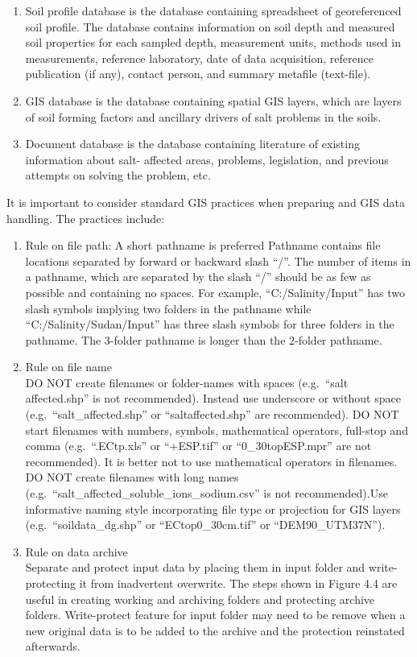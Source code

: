 \documentclass[
  10pt,
  b5paper,
]{book}
\providecommand{\tightlist}{%
  \setlength{\itemsep}{0pt}\setlength{\parskip}{0pt}}
\begin{document}
\begin{enumerate}
\def\labelenumi{\roman{enumi}.}
\tightlist
\item
  Soil profile database is the database containing spreadsheet of georeferenced soil profile. The database contains information on soil depth and measured soil properties for each sampled depth, measurement units, methods used in measurements, reference laboratory, date of data acquisition, reference publication (if any), contact person, and summary metafile (text-file).
\item
  GIS database is the database containing spatial GIS layers, which are layers of soil forming factors and ancillary drivers of salt problems in the soils.
\item
  Document database is the database containing literature of existing information about salt- affected areas, problems, legislation, and previous attempts on solving the problem, etc.
\end{enumerate}

It is important to consider standard GIS practices when preparing and GIS data handling. The practices include:

\begin{enumerate}
\def\labelenumi{\Roman{enumi}.}
\item
  Rule on file path: A short pathname is preferred
  Pathname contains file locations separated by forward or backward slash ``/''. The number of items in a pathname, which are separated by the slash ``/'' should be as few as possible and containing no spaces. For example, ``C:/Salinity/Input'' has two slash symbols implying two folders in the pathname while ``C:/Salinity/Sudan/Input'' has three slash symbols for three folders in the pathname. The 3-folder pathname is longer than the 2-folder pathname.
\item
  Rule on file name\\
  DO NOT create filenames or folder-names with spaces (e.g.~``salt affected.shp'' is not recommended). Instead use underscore or without space (e.g.~``salt\_affected.shp'' or ``saltaffected.shp'' are recommended). DO NOT start filenames with numbers, symbols, mathematical operators, full-stop and comma (e.g.~``.ECtp.xls'' or ``+ESP.tif'' or ``0\_30topESP.mpr'' are not recommended). It is better not to use mathematical operators in filenames.
  DO NOT create filenames with long names (e.g.~``salt\_affected\_soluble\_ions\_sodium.csv'' is not recommended).Use informative naming style incorporating file type or projection for GIS layers (e.g.~``soildata\_dg.shp'' or ``ECtop0\_30cm.tif'' or ``DEM90\_UTM37N'').
\item
  Rule on data archive\\
  Separate and protect input data by placing them in input folder and write-protecting it from inadvertent overwrite. The steps shown in Figure 4.4 are useful in creating working and archiving folders and protecting archive folders. Write-protect feature for input folder may need to be remove when a new original data is to be added to the archive and the protection reinstated afterwards.
\end{enumerate}
\end{document}
